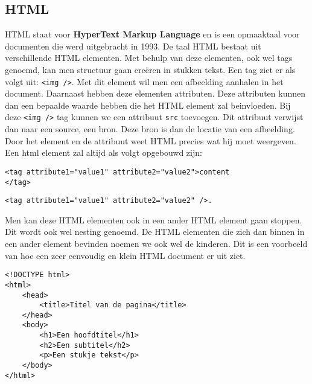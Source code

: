 \subsection{HTML}
HTML staat voor \textbf{HyperText Markup Language} en is een opmaaktaal voor documenten die werd uitgebracht in 1993. De taal HTML bestaat uit verschillende HTML elementen. Met behulp van deze elementen, ook wel tags genoemd, kan men structuur gaan creëren in stukken tekst. Een tag ziet er als volgt uit: \lstinline[basicstyle=\ttfamily\color{red}]|<img />|. Met dit element wil men een afbeelding aanhalen in het document. Daarnaast hebben deze elementen attributen. Deze attributen kunnen dan een bepaalde waarde hebben die het HTML element zal beinvloeden. Bij deze \lstinline[basicstyle=\ttfamily\color{red}]|<img />| tag kunnen we een attribuut \lstinline[basicstyle=\ttfamily\color{red}]|src| toevoegen. Dit attribuut verwijst dan naar een source, een bron. Deze bron is dan de locatie van een afbeelding. Door het element en de attribuut weet HTML precies wat hij moet weergeven. Een html element zal altijd als volgt opgebouwd zijn: 

\begin{lstlisting}[frame=single, caption=HTML Element voorbeeld]
<tag attribute1="value1" attribute2="value2">content
</tag>
\end{lstlisting}
\begin{lstlisting}[frame=single, caption=HTML Element voorbeeld]
<tag attribute1="value1" attribute2="value2" />.
\end{lstlisting}

Men kan deze HTML elementen ook in een ander HTML element gaan stoppen. Dit wordt ook wel nesting genoemd. De HTML elementen die zich dan binnen in een ander element bevinden noemen we ook wel de kinderen. Dit is een voorbeeld van hoe een zeer eenvoudig en klein HTML document er uit ziet.

\begin{lstlisting}[frame=single, caption=Voorbeeld van een HTML bestand]
<!DOCTYPE html>
<html>
	<head>
		<title>Titel van de pagina</title>
	</head>
	<body>
		<h1>Een hoofdtitel</h1>
		<h2>Een subtitel</h2>
		<p>Een stukje tekst</p>
	</body>
</html>
\end{lstlisting}

